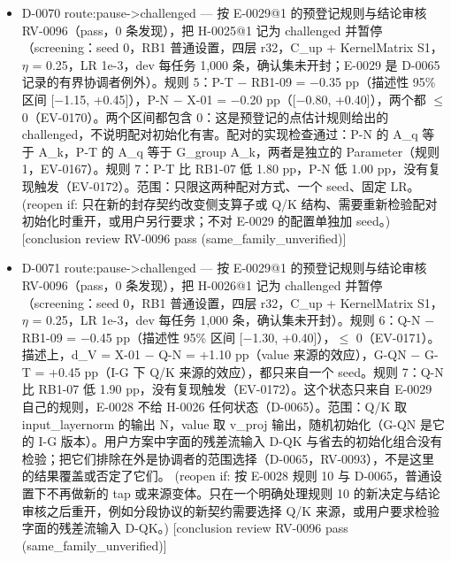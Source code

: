 \documentclass[11pt]{article}
\begin{document}
\begin{itemize}
\item D-0070 route:pause-\textgreater{}challenged --- 按 E-0029@1 的预登记规则与结论审核 RV-0096（pass，0 条发现），把 H-0025@1 记为 challenged 并暂停（screening：seed 0，RB1 普通设置，四层 r32，C\_up + KernelMatrix S1，\ensuremath{\eta} = 0.25，LR 1e-3，dev 每任务 1,000 条，确认集未开封；E-0029 是 D-0065 记录的有界协调者例外）。规则 5：P-T \ensuremath{-} RB1-09 = \ensuremath{-}0.35 pp（描述性 95\% 区间 [\ensuremath{-}1.15, +0.45]），P-N \ensuremath{-} X-01 = \ensuremath{-}0.20 pp（[\ensuremath{-}0.80, +0.40]），两个都 \ensuremath{\leq} 0（EV-0170）。两个区间都包含 0：这是预登记的点估计规则给出的 challenged，不说明配对初始化有害。配对的实现检查通过：P-N 的 A\_q 等于 A\_k，P-T 的 A\_q 等于 G\_group A\_k，两者是独立的 Parameter（规则 1，EV-0167）。规则 7：P-T 比 RB1-07 低 1.80 pp，P-N 低 1.00 pp，没有复现触发（EV-0172）。范围：只限这两种配对方式、一个 seed、固定 LR。 (reopen if: 只在新的封存契约改变侧支算子或 Q/K 结构、需要重新检验配对初始化时重开，或用户另行要求；不对 E-0029 的配置单独加 seed。) [conclusion review RV-0096 pass (same\_family\_unverified)]
\item D-0071 route:pause-\textgreater{}challenged --- 按 E-0029@1 的预登记规则与结论审核 RV-0096（pass，0 条发现），把 H-0026@1 记为 challenged 并暂停（screening：seed 0，RB1 普通设置，四层 r32，C\_up + KernelMatrix S1，\ensuremath{\eta} = 0.25，LR 1e-3，dev 每任务 1,000 条，确认集未开封）。规则 6：Q-N \ensuremath{-} RB1-09 = \ensuremath{-}0.45 pp（描述性 95\% 区间 [\ensuremath{-}1.30, +0.40]），\ensuremath{\leq} 0（EV-0171）。描述上，d\_V = X-01 \ensuremath{-} Q-N = +1.10 pp（value 来源的效应），G-QN \ensuremath{-} G-T = +0.45 pp（I-G 下 Q/K 来源的效应），都只来自一个 seed。规则 7：Q-N 比 RB1-07 低 1.90 pp，没有复现触发（EV-0172）。这个状态只来自 E-0029 自己的规则，E-0028 不给 H-0026 任何状态（D-0065）。范围：Q/K 取 input\_layernorm 的输出 N，value 取 v\_proj 输出，随机初始化（G-QN 是它的 I-G 版本）。用户方案中字面的残差流输入 D-QK 与省去的初始化组合没有检验；把它们排除在外是协调者的范围选择（D-0065，RV-0093），不是这里的结果覆盖或否定了它们。 (reopen if: 按 E-0028 规则 10 与 D-0065，普通设置下不再做新的 tap 或来源变体。只在一个明确处理规则 10 的新决定与结论审核之后重开，例如分段协议的新契约需要选择 Q/K 来源，或用户要求检验字面的残差流输入 D-QK。) [conclusion review RV-0096 pass (same\_family\_unverified)]

\end{itemize}
\end{document}
